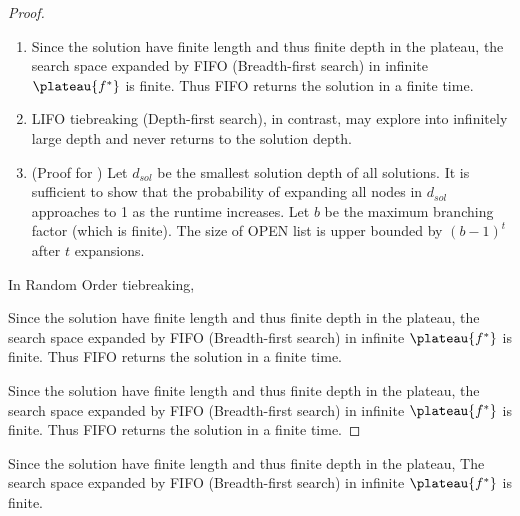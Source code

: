 \begin{proof}
\begin{enumerate}
 \item Since the solution have finite length and thus finite depth in the plateau, the search space expanded by FIFO (Breadth-first search) in infinite $\plateau{f^*}$ is finite.  Thus FIFO returns the solution in a finite time.
 \item LIFO tiebreaking (Depth-first search), in contrast,
       may explore into infinitely large depth and never returns to the solution depth.
 \item (Proof for )
       Let $d_{sol}$ be the smallest solution depth of all solutions.
       It is sufficient to show that the probability of expanding all nodes in $d_{sol}$
       approaches to 1 as the runtime increases.
       Let $b$ be the maximum branching factor (which is finite).
       The size of OPEN list is upper bounded by $(b-1)^t$ after $t$ expansions.
\end{enumerate}
 
In Random Order tiebreaking,


Since the solution have finite length and thus finite depth in the plateau,
the search space expanded by FIFO (Breadth-first search) in infinite $\plateau{f^*}$ is finite.
Thus FIFO returns the solution in a finite time.

Since the solution have finite length and thus finite depth in the plateau,
the search space expanded by FIFO (Breadth-first search) in infinite $\plateau{f^*}$ is finite.
Thus FIFO returns the solution in a finite time.
\end{proof}

Since the solution have finite length and thus finite depth in the plateau,
The search space expanded by FIFO (Breadth-first search) in infinite $\plateau{f^*}$ is finite.

% 

